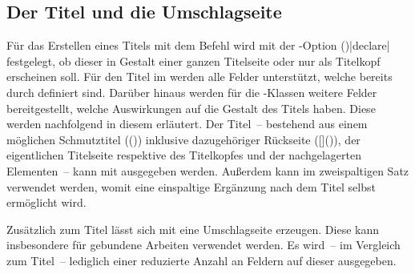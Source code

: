 \begin{Declaration*}{}
\begin{Declaration*}{}
\begin{Declaration*}{}
\subsection{Der Titel und die Umschlagseite}
%
%
%
%
%
Für das Erstellen eines Titels mit dem Befehl  wird mit der 
\KOMAScript-Option 
()|declare| festgelegt, ob 
dieser in Gestalt einer ganzen Titelseite oder nur als Titelkopf erscheinen 
soll. Für den Titel im \TUDCD werden alle Felder unterstützt, welche bereits 
durch \KOMAScript{} definiert sind. Darüber hinaus werden für die 
\TUDScript-Klassen weitere Felder bereitgestellt, welche Auswirkungen auf die 
Gestalt des Titels haben. Diese werden nachfolgend in diesem \autorefname 
erläutert. Der Titel~-- bestehend aus einem möglichen Schmutztitel 
(()) inklusive dazugehöriger Rückseite 
([]()), der 
eigentlichen Titelseite respektive des Titelkopfes und der nachgelagerten 
Elementen~-- kann mit  ausgegeben werden. Außerdem kann im 
zweispaltigen Satz  verwendet werden, womit eine 
einspaltige Ergänzung nach dem Titel selbst ermöglicht wird.

Zusätzlich zum Titel lässt sich mit  eine Umschlagseite 
erzeugen. Diese kann insbesondere für gebundene Arbeiten verwendet werden. Es 
wird~-- im Vergleich zum Titel~-- lediglich einer reduzierte Anzahl an Feldern 
auf dieser ausgegeben.


\end{Declaration*}
\end{Declaration*}
\end{Declaration*}
